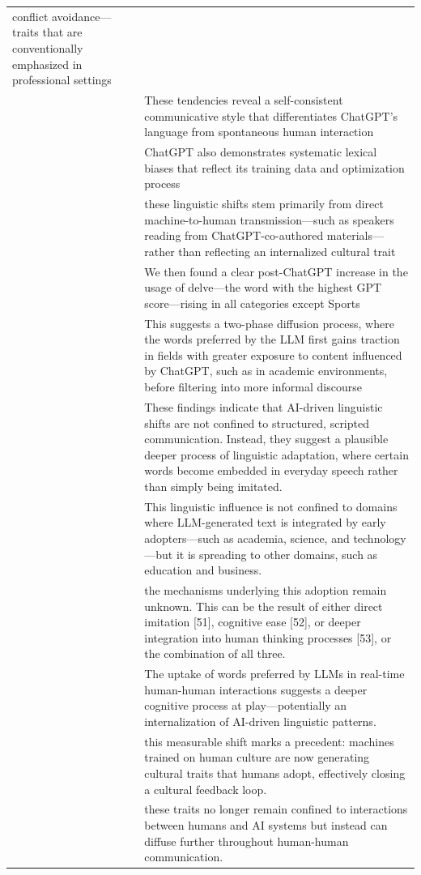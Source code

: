 \documentclass[
  letterpaper,
  DIV=11,
  numbers=noendperiod]{scrartcl}
\begin{document}
\begin{longtable}[]{@{}
  >{\raggedleft\arraybackslash}p{}
  >{\raggedright\arraybackslash}p{}@{}}
conflict avoidance---traits that are conventionally emphasized in
professional settings \\
83 & These tendencies reveal a self-consistent communicative style that
differentiates ChatGPT's language from spontaneous human interaction \\
84 & ChatGPT also demonstrates systematic lexical biases that reflect
its training data and optimization process \\
85 & these linguistic shifts stem primarily from direct machine-to-human
transmission---such as speakers reading from ChatGPT-co-authored
materials---rather than reflecting an internalized cultural trait \\
86 & We then found a clear post-ChatGPT increase in the usage of
delve---the word with the highest GPT score---rising in all categories
except Sports \\
87 & This suggests a two-phase diffusion process, where the words
preferred by the LLM first gains traction in fields with greater
exposure to content influenced by ChatGPT, such as in academic
environments, before filtering into more informal discourse \\
88 & These findings indicate that AI-driven linguistic shifts are not
confined to structured, scripted communication. Instead, they suggest a
plausible deeper process of linguistic adaptation, where certain words
become embedded in everyday speech rather than simply being imitated. \\
89 & This linguistic influence is not confined to domains where
LLM-generated text is integrated by early adopters---such as academia,
science, and technology---but it is spreading to other domains, such as
education and business. \\
90 & the mechanisms underlying this adoption remain unknown. This can be
the result of either direct imitation {[}51{]}, cognitive ease {[}52{]},
or deeper integration into human thinking processes {[}53{]}, or the
combination of all three. \\
91 & The uptake of words preferred by LLMs in real-time human-human
interactions suggests a deeper cognitive process at play---potentially
an internalization of AI-driven linguistic patterns. \\
92 & this measurable shift marks a precedent: machines trained on human
culture are now generating cultural traits that humans adopt,
effectively closing a cultural feedback loop. \\
93 & these traits no longer remain confined to interactions between
humans and AI systems but instead can diffuse further throughout
human-human communication. \\
\end{longtable}
\end{document}
